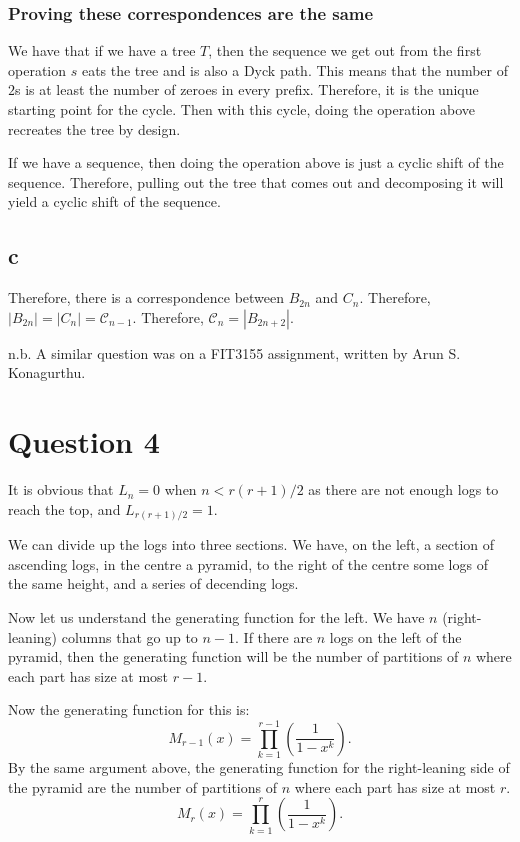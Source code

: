 \documentclass[]{article}
\theoremstyle{definition}
\numberwithin{theorem}{section}
\numberwithin{equation}{section}
\begin{document}
\subsubsection{Proving these correspondences are the same}
We have that if we have a tree $T$, then the sequence we get out from the first operation $s$ eats the tree and is also a Dyck path. This means that the number of $2$s is at least the number of zeroes in every prefix. Therefore, it is the unique starting point for the cycle. Then with this cycle, doing the operation above recreates the tree by design.

If we have a sequence, then doing the operation above is just a cyclic shift of the sequence. Therefore, pulling out the tree that comes out and decomposing it will yield a cyclic shift of the sequence. 

\subsection{c}
Therefore, there is a correspondence between $B_{2n}$ and $C_n$. Therefore, $|B_{2n}| = |C_n| = \mathcal{C}_{n - 1}$. Therefore, $\mathcal{C}_n = |B_{2n + 2}|$. 

n.b. A similar question was on a FIT3155 assignment, written by Arun S. Konagurthu.
\section{Question 4}

It is obvious that $L_n = 0$ when $n < r(r+1)/2$ as there are not enough logs to reach the top, and $L_{r(r+1)/2} = 1$. 

We can divide up the logs into three sections. We have, on the left, a section of ascending logs, in the centre a pyramid, to the right of the centre some logs of the same height, and a series of decending logs.

Now let us understand the generating function for the left. We have $n$ (right-leaning) columns that go up to $n-1$. If there are $n$ logs on the left of the pyramid, then the generating function will be the number of partitions of $n$ where each part has size at most $r - 1$. 

Now the generating function for this is:
\begin{equation}
	M_{r - 1}(x) = \prod_{k = 1}^{r - 1} \left(\frac{1}{1 - x^k}\right).
\end{equation}
By the same argument above, the generating function for the right-leaning side of the pyramid are the number of partitions of $n$ where each part has size at most $r$.
\begin{equation}
	M_{r}(x) = \prod_{k = 1}^{r} \left(\frac{1}{1 - x^k}\right).
\end{equation}
\end{document}
